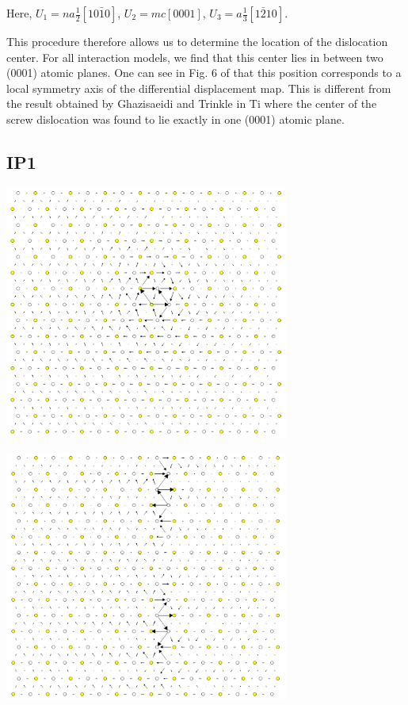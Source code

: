 \documentclass[11pt]{article}
\begin{document}
Here, \(U_1 = na \frac{1}{2} [10\bar{1}0]\), \(U_2 = mc [0001]\), 
\(U_3 =  a \frac{1}{3} [1\bar{2}10]\).

This procedure therefore allows us to determine the location of
the dislocation center. For all interaction models, we find that
this center lies in between two (0001) atomic planes. One can see
in Fig. 6 of \cite{Clouet2012} that this position corresponds to a
local symmetry axis of the differential displacement map. This is
different from the result obtained by Ghazisaeidi and Trinkle
\cite{Ghazisaeidi2012} in Ti where the center of the screw
dislocation was found to lie exactly in one (0001) atomic plane.

\newpage


\subsection{IP1}
\label{sec:org6f925d3}
\begin{center}
\includegraphics[width=0.7\textwidth]{Images/final_model_IP1_partial_dd_initial.png}
\end{center}
\begin{center}
\includegraphics[width=0.7\textwidth]{Images/final_model_IP1_partial_dd_final.png}
\end{center} 
\end{document}
